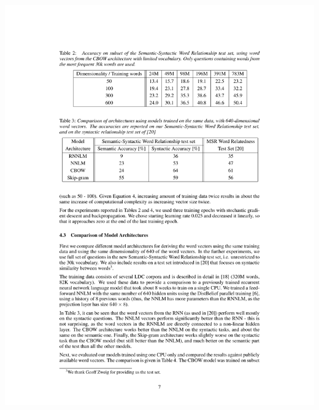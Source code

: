 \documentclass{beamer}
\begin{document}
\begin{frame}
\includegraphics[width=\linewidth]{mikolov-results1}
\end{frame}
\end{document}
